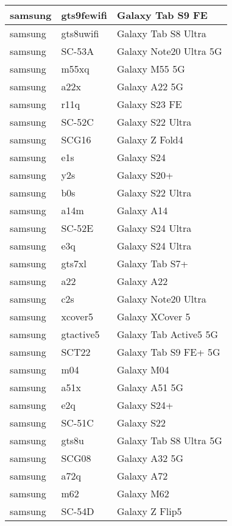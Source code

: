 \begin{tabularx}{\linewidth}{|l|X|X|}
        samsung & gts9fewifi & Galaxy Tab S9 FE \\ \hline
        samsung & gts8uwifi & Galaxy Tab S8 Ultra \\ \hline
        samsung & SC-53A & Galaxy Note20 Ultra 5G \\ \hline
        samsung & m55xq & Galaxy M55 5G \\ \hline
        samsung & a22x & Galaxy A22 5G \\ \hline
        samsung & r11q & Galaxy S23 FE \\ \hline
        samsung & SC-52C & Galaxy S22 Ultra \\ \hline
        samsung & SCG16 & Galaxy Z Fold4 \\ \hline
        samsung & e1s & Galaxy S24 \\ \hline
        samsung & y2s & Galaxy S20+ \\ \hline
        samsung & b0s & Galaxy S22 Ultra \\ \hline
        samsung & a14m & Galaxy A14 \\ \hline
        samsung & SC-52E & Galaxy S24 Ultra \\ \hline
        samsung & e3q & Galaxy S24 Ultra \\ \hline
        samsung & gts7xl & Galaxy Tab S7+ \\ \hline
        samsung & a22 & Galaxy A22 \\ \hline
        samsung & c2s & Galaxy Note20 Ultra \\ \hline
        samsung & xcover5 & Galaxy XCover 5 \\ \hline
        samsung & gtactive5 & Galaxy Tab Active5 5G \\ \hline
        samsung & SCT22 & Galaxy Tab S9 FE+ 5G \\ \hline
        samsung & m04 & Galaxy M04 \\ \hline
        samsung & a51x & Galaxy A51 5G \\ \hline
        samsung & e2q & Galaxy S24+ \\ \hline
        samsung & SC-51C & Galaxy S22 \\ \hline
        samsung & gts8u & Galaxy Tab S8 Ultra 5G \\ \hline
        samsung & SCG08 & Galaxy A32 5G \\ \hline
        samsung & a72q & Galaxy A72 \\ \hline
        samsung & m62 & Galaxy M62 \\ \hline
        samsung & SC-54D & Galaxy Z Flip5 \\ \hline

\end{tabularx}
